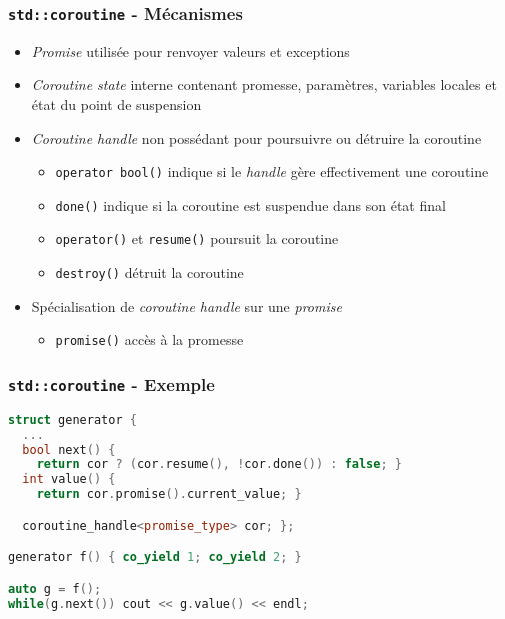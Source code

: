 \documentclass[C++.tex]{subfiles}
\begin{document}
\begin{frame}[fragile]
	\frametitle{\lstinline|std::coroutine| - Mécanismes}
	\begin{itemize}
		\item \textit{Promise} utilisée pour renvoyer valeurs et exceptions
		\item \textit{Coroutine state} interne contenant promesse, paramètres, variables locales et état du point de suspension
		\item \textit{Coroutine handle} non possédant pour poursuivre ou détruire la coroutine
		\begin{itemize}
			\item \lstinline|operator bool()| indique si le \textit{handle} gère effectivement une coroutine
			\item \lstinline|done()| indique si la coroutine est suspendue dans son état final


			\item \lstinline|operator()| et \lstinline|resume()| poursuit la coroutine
			\item \lstinline|destroy()| détruit la coroutine
		\end{itemize}
		\item Spécialisation de \textit{coroutine handle} sur une \textit{promise}
		\begin{itemize}
			\item \lstinline|promise()| accès à la promesse
		\end{itemize}
	\end{itemize}
\end{frame}

\begin{frame}[fragile]
	\frametitle{\lstinline|std::coroutine| - Exemple}
	\begin{lstlisting}[language=C++]
struct generator {
  ...
  bool next() {
    return cor ? (cor.resume(), !cor.done()) : false; }
  int value() {
    return cor.promise().current_value; }

  coroutine_handle<promise_type> cor; };

generator f() { co_yield 1; co_yield 2; }

auto g = f();
while(g.next()) cout << g.value() << endl;\end{lstlisting}
\end{frame}
\end{document}

